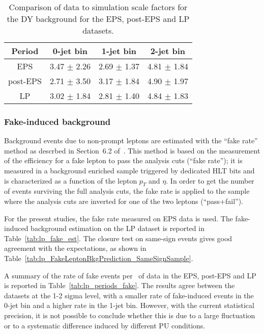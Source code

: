 \begin{table}[!htbp]
\begin{center}
\begin{tabular}{c c c c} 
\hline
Period & 0-jet bin & 1-jet bin & 2-jet bin \\ 
\hline
EPS      & 3.47 $\pm$ 2.26 & 2.69 $\pm$ 1.37 & 4.81 $\pm$ 1.84 \\
post-EPS & 2.71 $\pm$ 3.50 & 3.17 $\pm$ 1.84 & 4.90 $\pm$ 1.97 \\
LP       & 3.02 $\pm$ 1.84 & 2.81 $\pm$ 1.40 & 4.84 $\pm$ 1.83 \\
\hline
\end{tabular}
\caption{Comparison of data to simulation scale factors for the DY background for the EPS, post-EPS and LP datasets.}
\label{tab:lp_periods_dy}
\end{center}
\end{table}

\subsubsection{Fake-induced background}

Background events due to non-prompt leptons are estimated with the ``fake rate'' method as descrbed in Section~6.2 of~\cite{epsnote}.
This method is based on the measurement of the efficiency for a fake lepton to pass the analysis cuts (``fake rate''); 
it is measured in a background enriched sample triggered by dedicated HLT bits and is characterized as a function of the lepton $p_T$ and $\eta$. 
In order to get the number of events surviving the full analysis cuts, the fake rate is applied to the sample where the analysis cuts are 
inverted for one of the two leptons (``pass+fail'').

For the present studies, the fake rate measured on EPS data is used.
The fake-induced background estimation on the LP dataset is reported in Table~\ref{tab:lp_fake_est}.
The closure test on same-sign events gives good agreement with the expectations, 
as shown in Table~\ref{tab:lp_FakeLeptonBkgPrediction_SameSignSample}.

A summary of the rate of fake events per \ifb~of data in the EPS, post-EPS and LP 
is reported in Table~\ref{tab:lp_periods_fake}.
The results agree between the datasets at the 1-2 sigma level, with a smaller rate of fake-induced events in the 0-jet bin 
and a higher rate in the 1-jet bin. 
However, with the current statistical precision, it is not possible to conclude whether this is due to a large fluctuation or to a systematic 
difference induced by different PU conditions.

